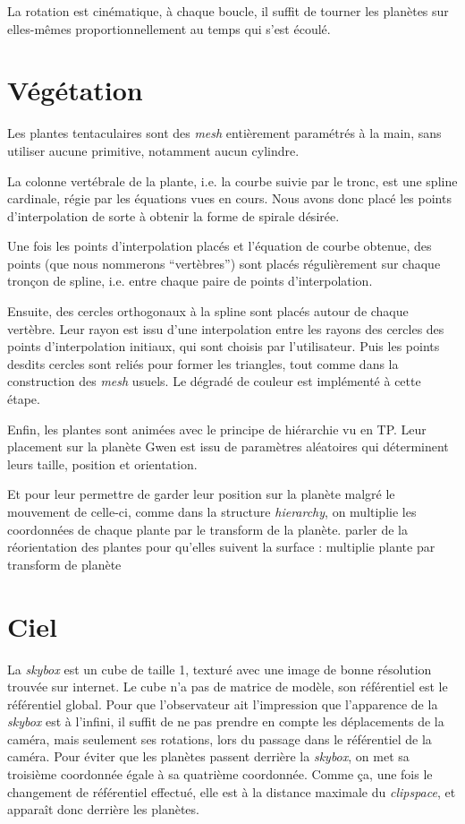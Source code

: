 \documentclass[a4paper,12pt,twoside]{article}
\begin{document}
La rotation est cinématique, à chaque boucle, il suffit de tourner les planètes sur elles-mêmes proportionnellement au temps qui s'est écoulé.

\section{Végétation}

Les plantes tentaculaires sont des \textit{mesh} entièrement paramétrés à la main, sans utiliser aucune primitive, notamment aucun cylindre.

La colonne vertébrale de la plante, i.e. la courbe suivie par le tronc, est une spline cardinale, régie par les équations vues en cours. Nous avons donc placé les points d'interpolation de sorte à obtenir la forme de spirale désirée.

Une fois les points d'interpolation placés et l'équation de courbe obtenue, des points (que nous nommerons “vertèbres”) sont placés régulièrement sur chaque tronçon de spline, i.e. entre chaque paire de points d'interpolation.

Ensuite, des cercles orthogonaux à la spline sont placés autour de chaque vertèbre. Leur rayon est issu d'une interpolation entre les rayons des cercles des points d'interpolation initiaux, qui sont choisis par l'utilisateur.
Puis les points desdits cercles sont reliés pour former les triangles, tout comme dans la construction des \textit{mesh} usuels. Le dégradé de couleur est implémenté à cette étape.

Enfin, les plantes sont animées avec le principe de hiérarchie vu en TP.
Leur placement sur la planète Gwen est issu de paramètres aléatoires qui déterminent leurs taille, position et orientation.

Et pour leur permettre de garder leur position sur la planète malgré le mouvement de celle-ci, comme dans la structure \textit{hierarchy}, on multiplie les coordonnées de chaque plante par le transform de la planète.
parler de la réorientation des plantes pour qu'elles suivent la surface : multiplie plante par transform de planète


\section{Ciel}

La \textit{skybox} est un cube de taille 1, texturé avec une image de bonne résolution trouvée sur internet. Le cube n'a pas de matrice de modèle, son référentiel est le référentiel global. Pour que l'observateur ait l'impression que l'apparence de la \textit{skybox} est à l'infini, il suffit de ne pas prendre en compte les déplacements de la caméra, mais seulement ses rotations, lors du passage dans le référentiel de la caméra. Pour éviter que les planètes passent derrière la \textit{skybox}, on met sa troisième coordonnée égale à sa quatrième coordonnée. Comme ça, une fois le changement de référentiel effectué, elle est à la distance maximale du \textit{clipspace}, et apparaît donc derrière les planètes.
\end{document}
